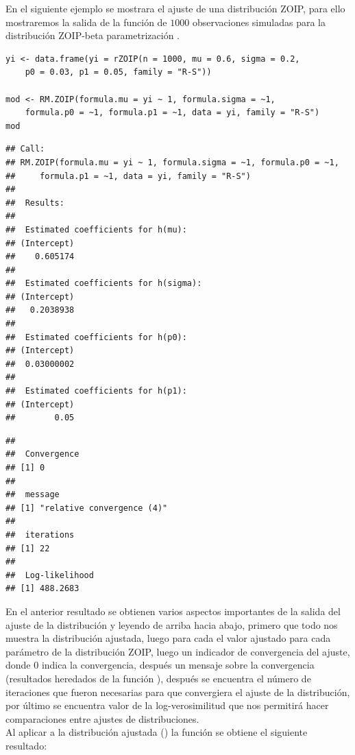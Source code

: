 En el siguiente ejemplo se mostrara el ajuste de una distribuci\'{o}n ZOIP, para ello mostraremos la salida de la funci\'{o}n  de $1000$ observaciones simuladas para la distribuci\'{o}n ZOIP-beta parametrizaci\'{o}n \cite{Stasinopoulos2}.\\

\begin{verbatim}
yi <- data.frame(yi = rZOIP(n = 1000, mu = 0.6, sigma = 0.2, 
    p0 = 0.03, p1 = 0.05, family = "R-S"))

mod <- RM.ZOIP(formula.mu = yi ~ 1, formula.sigma = ~1, 
    formula.p0 = ~1, formula.p1 = ~1, data = yi, family = "R-S")
mod
\end{verbatim}

\begin{verbatim}
## Call:
## RM.ZOIP(formula.mu = yi ~ 1, formula.sigma = ~1, formula.p0 = ~1, 
##     formula.p1 = ~1, data = yi, family = "R-S")
## 
##  Results: 
## 
##  Estimated coefficients for h(mu): 
## (Intercept) 
##    0.605174 
## 
##  Estimated coefficients for h(sigma): 
## (Intercept) 
##   0.2038938 
## 
##  Estimated coefficients for h(p0): 
## (Intercept) 
##  0.03000002 
## 
##  Estimated coefficients for h(p1): 
## (Intercept) 
##        0.05 
\end{verbatim}
\begin{verbatim}
## 
##  Convergence 
## [1] 0
## 
##  message 
## [1] "relative convergence (4)"
## 
##  iterations 
## [1] 22
## 
##  Log-likelihood 
## [1] 488.2683
\end{verbatim}

En el anterior resultado se obtienen varios aspectos importantes de la salida del ajuste de la distribuci\'{o}n y leyendo de arriba hacia abajo, primero que todo nos muestra la distribuci\'{o}n ajustada, luego para cada el valor ajustado para cada par\'{a}metro de la distribuci\'{o}n ZOIP, luego un indicador de convergencia del ajuste, donde 0 indica la convergencia, despu\'{e}s un mensaje sobre la convergencia (resultados heredados de la funci\'{o}n ), despu\'{e}s se encuentra el n\'{u}mero de iteraciones que fueron necesarias para que convergiera el ajuste de la distribuci\'{o}n, por \'{u}ltimo se encuentra valor de la log-verosimilitud que nos permitir\'{a} hacer comparaciones entre ajustes de distribuciones.\\ 

 Al aplicar a la distribuci\'{o}n ajustada () la funci\'{o}n  se obtiene el siguiente resultado:

